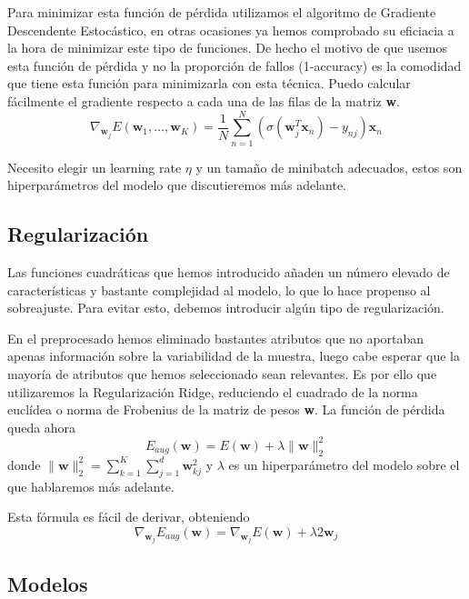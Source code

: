 \documentclass[a4]{article}
\begin{document}
Para minimizar esta función de pérdida utilizamos el algoritmo de
Gradiente Descendente Estocástico, en otras ocasiones ya hemos
comprobado su eficiacia a la hora de minimizar este tipo de funciones.
De hecho el motivo de que usemos esta función de pérdida y no la
proporción de fallos (1-accuracy) es la comodidad que tiene esta
función para minimizarla con esta técnica. Puedo calcular fácilmente
el gradiente respecto a cada una de las filas de la matriz \textbf{w}.\vspace{-2mm}
\[\nabla_{\textbf{w}_j}E(\textbf{w}_1,\ldots,\textbf{w}_K)=\frac{1}{N}\sum_{n=1}^N(\sigma(\textbf{w}_j^T \textbf{x}_n)-y_{nj})\textbf{x}_n\]\vspace{-4mm}

Necesito elegir un learning rate $\eta$ y un tamaño de minibatch
adecuados, estos son hiperparámetros del modelo que discutieremos más
adelante.

\subsection{Regularización}

Las funciones cuadráticas que hemos introducido añaden un número
elevado de características y bastante complejidad al modelo, lo que lo
hace propenso al sobreajuste. Para evitar esto, debemos introducir
algún tipo de regularización.

En el preprocesado hemos eliminado bastantes atributos que no
aportaban apenas información sobre la variabilidad de la muestra,
luego cabe esperar que la mayoría de atributos que hemos seleccionado
sean relevantes. Es por ello que utilizaremos la Regularización Ridge,
reduciendo el cuadrado de la norma euclídea o norma de Frobenius de la
matriz de pesos \textbf{w}. La función de pérdida queda ahora
\vspace{-2mm}
\[E_{aug}(\textbf{w})=E(\textbf{w})+\lambda
  \|\textbf{w}\|_2^2\]\vspace{-2mm} donde
$\|\textbf{w}\|_2^2=\sum\limits_{k=1}^K\sum\limits_{j=1}^d
\textbf{w}_{kj}^2$ y $\lambda$ es un hiperparámetro del modelo sobre
el que hablaremos más adelante.

Esta fórmula es fácil de derivar, obteniendo \vspace{-2mm}
\[\nabla_{\textbf{w}_j}E_{aug}(\textbf{w})=\nabla_{\textbf{w}_j}E(\textbf{w})+\lambda 2\textbf{w}_j\]

\subsection{Modelos}
\end{document}
